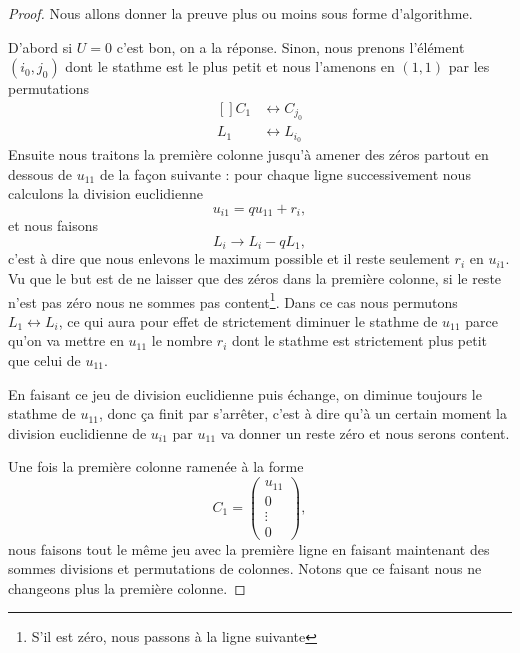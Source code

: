 \begin{proof}
    Nous allons donner la preuve plus ou moins sous forme d'algorithme.

    D'abord si \( U=0\) c'est bon, on a la réponse. Sinon, nous prenons l'élément \( (i_0,j_0)\) dont le stathme est le plus petit et nous l'amenons en \( (1,1)\) par les permutations
    \begin{equation}
        \begin{aligned}[]
            C_1&\leftrightarrow C_{j_0}\\
            L_1&\leftrightarrow L_{i_0}
        \end{aligned}
    \end{equation}
    Ensuite nous traitons la première colonne jusqu'à amener des zéros partout en dessous de \( u_{11}\) de la façon suivante : pour chaque ligne successivement nous calculons la division euclidienne
    \begin{equation}
        u_{i1}=qu_{11}+r_i,
    \end{equation}
    et nous faisons
    \begin{equation}
        L_i\to L_i-qL_1,
    \end{equation}
    c'est à dire que nous enlevons le maximum possible et il reste seulement \( r_i\) en \( u_{i1}\). Vu que le but est de ne laisser que des zéros dans la première colonne, si le reste n'est pas zéro nous ne sommes pas content\footnote{S'il est zéro, nous passons à la ligne suivante}. Dans ce cas nous permutons \( L_1\leftrightarrow L_i\), ce qui aura pour effet de strictement diminuer le stathme de \( u_{11}\) parce qu'on va mettre en \( u_{11}\) le nombre \( r_i\) dont le stathme est strictement plus petit que celui de \( u_{11}\).

    En faisant ce jeu de division euclidienne puis échange, on diminue toujours le stathme de \( u_{11}\), donc ça finit par s'arrêter, c'est à dire qu'à un certain moment la division euclidienne de \( u_{i1}\) par \( u_{11}\) va donner un reste zéro et nous serons content.

    Une fois la première colonne ramenée à la forme
    \begin{equation}
        C_1=\begin{pmatrix}
            u_{11}    \\ 
            0    \\ 
            \vdots    \\ 
            0    
        \end{pmatrix},
    \end{equation}
    nous faisons tout le même jeu avec la première ligne en faisant maintenant des sommes divisions et permutations de colonnes. Notons que ce faisant nous ne changeons plus la première colonne.


\end{proof}
